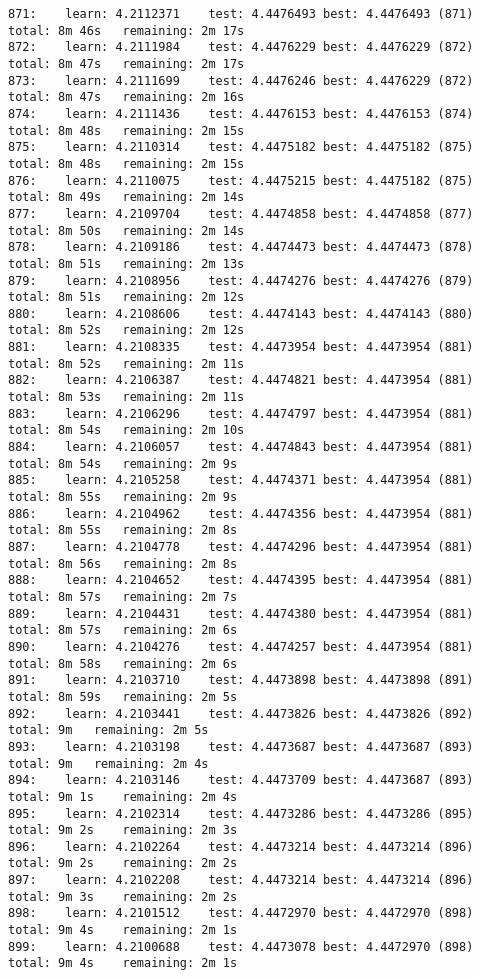 \documentclass[11pt]{article}
\begin{document}
\begin{Verbatim}[commandchars=\\\{\}]
871:	learn: 4.2112371	test: 4.4476493	best: 4.4476493 (871)	total: 8m 46s	remaining: 2m 17s
872:	learn: 4.2111984	test: 4.4476229	best: 4.4476229 (872)	total: 8m 47s	remaining: 2m 17s
873:	learn: 4.2111699	test: 4.4476246	best: 4.4476229 (872)	total: 8m 47s	remaining: 2m 16s
874:	learn: 4.2111436	test: 4.4476153	best: 4.4476153 (874)	total: 8m 48s	remaining: 2m 15s
875:	learn: 4.2110314	test: 4.4475182	best: 4.4475182 (875)	total: 8m 48s	remaining: 2m 15s
876:	learn: 4.2110075	test: 4.4475215	best: 4.4475182 (875)	total: 8m 49s	remaining: 2m 14s
877:	learn: 4.2109704	test: 4.4474858	best: 4.4474858 (877)	total: 8m 50s	remaining: 2m 14s
878:	learn: 4.2109186	test: 4.4474473	best: 4.4474473 (878)	total: 8m 51s	remaining: 2m 13s
879:	learn: 4.2108956	test: 4.4474276	best: 4.4474276 (879)	total: 8m 51s	remaining: 2m 12s
880:	learn: 4.2108606	test: 4.4474143	best: 4.4474143 (880)	total: 8m 52s	remaining: 2m 12s
881:	learn: 4.2108335	test: 4.4473954	best: 4.4473954 (881)	total: 8m 52s	remaining: 2m 11s
882:	learn: 4.2106387	test: 4.4474821	best: 4.4473954 (881)	total: 8m 53s	remaining: 2m 11s
883:	learn: 4.2106296	test: 4.4474797	best: 4.4473954 (881)	total: 8m 54s	remaining: 2m 10s
884:	learn: 4.2106057	test: 4.4474843	best: 4.4473954 (881)	total: 8m 54s	remaining: 2m 9s
885:	learn: 4.2105258	test: 4.4474371	best: 4.4473954 (881)	total: 8m 55s	remaining: 2m 9s
886:	learn: 4.2104962	test: 4.4474356	best: 4.4473954 (881)	total: 8m 55s	remaining: 2m 8s
887:	learn: 4.2104778	test: 4.4474296	best: 4.4473954 (881)	total: 8m 56s	remaining: 2m 8s
888:	learn: 4.2104652	test: 4.4474395	best: 4.4473954 (881)	total: 8m 57s	remaining: 2m 7s
889:	learn: 4.2104431	test: 4.4474380	best: 4.4473954 (881)	total: 8m 57s	remaining: 2m 6s
890:	learn: 4.2104276	test: 4.4474257	best: 4.4473954 (881)	total: 8m 58s	remaining: 2m 6s
891:	learn: 4.2103710	test: 4.4473898	best: 4.4473898 (891)	total: 8m 59s	remaining: 2m 5s
892:	learn: 4.2103441	test: 4.4473826	best: 4.4473826 (892)	total: 9m	remaining: 2m 5s
893:	learn: 4.2103198	test: 4.4473687	best: 4.4473687 (893)	total: 9m	remaining: 2m 4s
894:	learn: 4.2103146	test: 4.4473709	best: 4.4473687 (893)	total: 9m 1s	remaining: 2m 4s
895:	learn: 4.2102314	test: 4.4473286	best: 4.4473286 (895)	total: 9m 2s	remaining: 2m 3s
896:	learn: 4.2102264	test: 4.4473214	best: 4.4473214 (896)	total: 9m 2s	remaining: 2m 2s
897:	learn: 4.2102208	test: 4.4473214	best: 4.4473214 (896)	total: 9m 3s	remaining: 2m 2s
898:	learn: 4.2101512	test: 4.4472970	best: 4.4472970 (898)	total: 9m 4s	remaining: 2m 1s
899:	learn: 4.2100688	test: 4.4473078	best: 4.4472970 (898)	total: 9m 4s	remaining: 2m 1s

\end{Verbatim}
\end{document}

